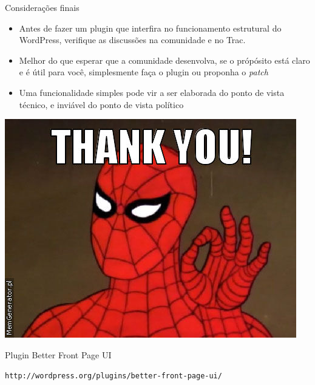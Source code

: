 \documentclass{beamer}
\begin{document}
\begin{frame}{Considerações finais}
\begin{itemize}
  \pause \item Antes de fazer um plugin que interfira no funcionamento
    estrutural do WordPress, verifique as discussões na comunidade e no Trac.
  \pause \item Melhor do que esperar que a comunidade desenvolva, se o
    própósito está claro e é útil para você, simplesmente faça o plugin ou
    proponha o \emph{patch}
  \pause \item Uma funcionalidade simples pode vir a ser elaborada do ponto de
    vista técnico, e inviável do ponto de vista político
\end{itemize}
\end{frame}

\begin{frame}
\begin{center}

  \includegraphics[height=0.6\textheight]{./img/thank-you.jpg}

  Plugin Better Front Page UI

  \texttt{http://wordpress.org/plugins/better-front-page-ui/}

\end{center}
\end{frame}
\end{document}
